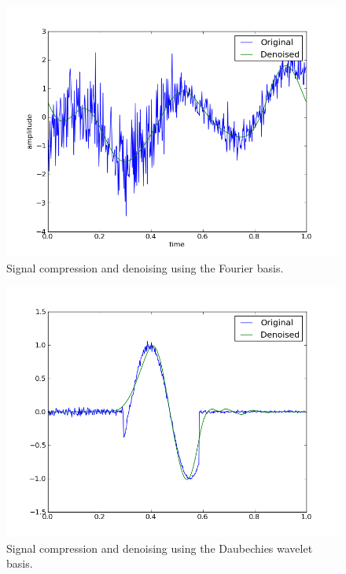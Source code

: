 \documentclass[10pt,conference,compsocconf]{IEEEtran}
\begin{document}
	\begin{figure}[tbp]
		\centering
		\includegraphics[width=\columnwidth]{denoised_signal_1d}
		\caption{Signal compression and denoising using the Fourier basis.}
		\vspace{-3mm}
		\label{fig:denoise-fourier}
	\end{figure}
	\begin{figure}[htbp]
		\centering
		\includegraphics[width=\columnwidth]{local_wdenoised_1d}
		\vspace{-3mm}
		\caption{Signal compression and denoising using the Daubechies wavelet basis.}
		\label{fig:denoise-wavelet}
	\end{figure}
	
\end{document}
